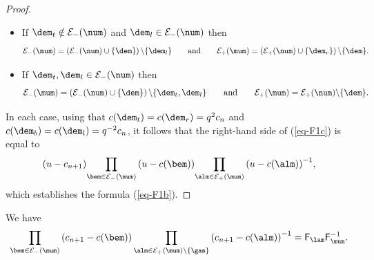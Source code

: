 \begin{proof}
\begin{itemize}
\item If $\dem_t\notin {\cal{E}}_-(\num)$ and $\dem_l\in {\cal{E}}_-(\num)$ then \[{\cal{E}}_-(\mum)=\left({\cal{E}}_-(\num)\cup\{\dem\}\right)\backslash\{\dem_l\}\qquad\textrm{and}\qquad {\cal{E}}_+(\mum)=\left({\cal{E}}_+(\num)\cup\{\dem_r\}\right)\backslash\{\dem\}  .\]

\item If $\dem_t,\dem_l\in {\cal{E}}_-(\num)$ then \[{\cal{E}}_-(\mum)=\left({\cal{E}}_-(\num)\cup\{\dem\}\right)\backslash\{\dem_t,\dem_l\}\qquad\textrm{and}\qquad {\cal{E}}_+(\mum)={\cal{E}}_+(\num)\backslash\{\dem\}  .\]
\end{itemize}
In each case,
using that $c(\dem_t)=c(\dem_r)=q^2c_n$ and $c(\dem_b)=c(\dem_l)=q^{-2}c_n$,
it follows that the right-hand side of (\ref{eq-F1c}) is equal to
\[(u-c_{n+1}) {\prod_{\bem\in {\cal{E}}_-(\mum)}\left(u-c(\bem)\right)} {\prod_{\alm\in {\cal{E}}_+(\mum)}\left(u-c(\alm)\right)^{-1}} ,
\]
which establishes the formula (\ref{eq-F1b}).
\end{proof}

\begin{Lemma}\label{lemm-f1}
We have
\begin{gather*}%
\prod_{\bem\in {\cal{E}}_-(\mum)}\left(c_{n+1}-c(\bem)\right)\prod_{\alm\in {\cal{E}}_+(\mum)\backslash\{\gam\}}\left(c_{n+1}-c(\alm)\right)^{-1}=\mathsf{F}_{\lam} \mathsf{F}_{\mum}^{-1}  .
\end{gather*}
\end{Lemma}

